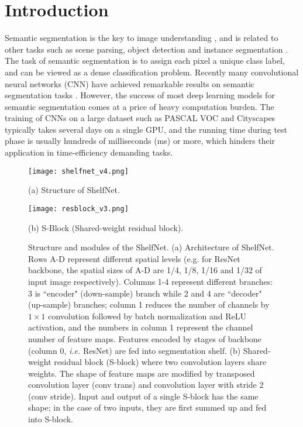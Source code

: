 \documentclass[10pt,twocolumn,letterpaper]{article}
\begin{document}
\section{Introduction}
\label{introduction}
Semantic segmentation is the key to image understanding \cite{everingham2015pascal,mottaghi2014role}, and is related to other tasks such as scene parsing, object detection and instance segmentation \cite{lin2014microsoft, zhou2017scene}. 
The task of semantic segmentation is to assign each pixel a unique class label, and can be viewed as a dense classification problem. Recently many convolutional neural networks (CNN) have achieved remarkable results on semantic segmentation tasks \cite{long2015fully,chen2016deeplab,zhao2017pyramid}. However, the success of most deep learning models for semantic segmentation comes at a price of heavy computation burden. The training of CNNs on a large dataset such as PASCAL VOC \cite{everingham2015pascal} and Cityscapes \cite{cordts2016cityscapes} typically takes several days on a single GPU, and the running time during test phase is usually hundreds of milliseconds (ms) or more, which hinders their application in time-efficiency demanding tasks.






\begin{figure*}[t!]
    \centering
    \begin{minipage}{.7\textwidth}
        \centering
        \texttt{[image: shelfnet\_v4.png]}
        \caption*{\small{(a) Structure of ShelfNet.}}
    \end{minipage}\begin{minipage}{0.25\textwidth}
        \centering
        \texttt{[image: resblock\_v3.png]}
        \caption*{\small{(b) S-Block (Shared-weight residual block).}}
    \end{minipage}
    \caption{\small{Structure and modules of the ShelfNet. (a) Architecture of ShelfNet. Rows A-D represent different spatial levels (e.g. for ResNet backbone, the spatial sizes of A-D are 1/4, 1/8, 1/16 and 1/32 of input image respectively). Columns 1-4 represent different branches: 3 is ``encoder" (down-sample) branch while 2 and 4 are ``decoder" (up-sample) branches; column 1 reduces the number of channels by $1\times1$ convolution followed by batch normalization and ReLU activation, and the numbers in column 1 represent the channel number of feature maps. Features encoded by stages of backbone (column 0, \textit{i.e.} ResNet) are fed into segmentation shelf. (b) Shared-weight residual block (S-block) where two convolution layers share weights. The shape of feature maps are modified by transposed convolution layer (conv trans) and convolution layer with stride 2 (conv stride). Input and output of a single S-block has the same shape; in the case of two inputs, they are first summed up and fed into S-block.} }
    \label{fig:shelfnet}
\end{figure*}
\end{document}
